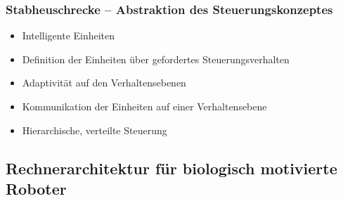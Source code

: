 \subsubsection{Stabheuschrecke – Abstraktion des Steuerungskonzeptes}
\begin{itemize}
\item Intelligente Einheiten
\item Definition der Einheiten über gefordertes Steuerungsverhalten
\item Adaptivität auf den Verhaltensebenen
\item Kommunikation der Einheiten auf einer Verhaltensebene
\item Hierarchische, verteilte Steuerung
\end{itemize}
\subsection{Rechnerarchitektur für biologisch motivierte Roboter}
